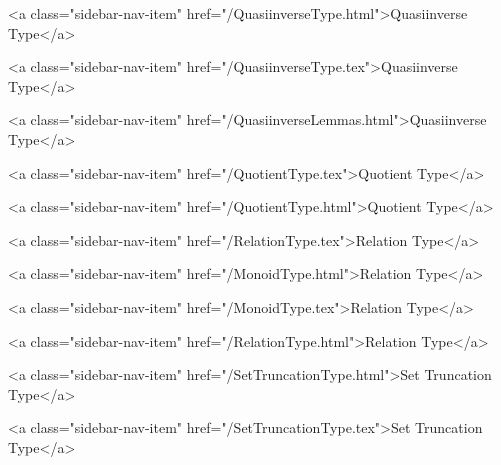       
    
      
        
          <a class="sidebar-nav-item" href="/QuasiinverseType.html">Quasiinverse Type</a>
        
      
    
      
        
          <a class="sidebar-nav-item" href="/QuasiinverseType.tex">Quasiinverse Type</a>
        
      
    
      
        
          <a class="sidebar-nav-item" href="/QuasiinverseLemmas.html">Quasiinverse Type</a>
        
      
    
      
        
          <a class="sidebar-nav-item" href="/QuotientType.tex">Quotient Type</a>
        
      
    
      
        
          <a class="sidebar-nav-item" href="/QuotientType.html">Quotient Type</a>
        
      
    
      
        
          <a class="sidebar-nav-item" href="/RelationType.tex">Relation Type</a>
        
      
    
      
        
          <a class="sidebar-nav-item" href="/MonoidType.html">Relation Type</a>
        
      
    
      
        
          <a class="sidebar-nav-item" href="/MonoidType.tex">Relation Type</a>
        
      
    
      
        
          <a class="sidebar-nav-item" href="/RelationType.html">Relation Type</a>
        
      
    
      
        
          <a class="sidebar-nav-item" href="/SetTruncationType.html">Set Truncation Type</a>
        
      
    
      
        
          <a class="sidebar-nav-item" href="/SetTruncationType.tex">Set Truncation Type</a>
        
